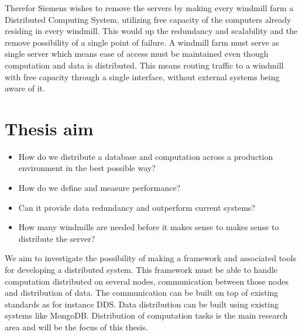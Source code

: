 Therefor Siemens wishes to remove the servers by making every windmill farm a Distributed Computing System, utilizing free capacity of the computers already residing in every windmill. This would up the redundancy and scalability and the remove possibility of a single point of failure. A windmill farm must serve as single server which means ease of access must be maintained even though computation and data is distributed. This means routing traffic to a windmill with free capacity through a single interface, without external systems being aware of it.


\section{Thesis aim}

\begin{itemize}
	\item How do we distribute a database and computation across a production environment in the best possible way?
	\item How do we define and measure performance?
	\item Can it provide data redundancy and outperform current systems?
	\item How many windmills are needed before it makes sense to makes sense to distribute the server?
\end{itemize}

We aim to investigate the possibility of making a framework and associated tools for developing a distributed system. 
This framework must be able to handle computation distributed on several nodes, communication between those nodes and distribution of data. 
The communication can be built on top of existing standards as for instance DDS. Data distribution can be built using existing systems like MongoDB. 
Distribution of computation tasks is the main research area and will be the focus of this thesis.

